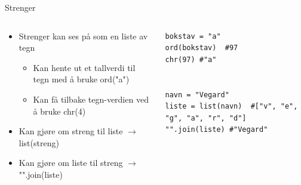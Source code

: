 \documentclass[screen, aspectratio=169]{beamer}
\begin{document}
\begin{frame}[fragile]{Strenger}
	\begin{columns}
		\begin{column}{.6\textwidth}
			\begin{itemize}
				\item Strenger kan ses på som en liste av tegn
				\begin{itemize}
					\item Kan hente ut et tallverdi til tegn med å bruke ord("a")
					\item Kan få tilbake tegn-verdien ved å bruke chr(4)
				\end{itemize}
				\item Kan gjøre om streng til liste $\rightarrow$ list(streng)
				\item Kan gjøre om liste til streng $\rightarrow$ "".join(liste)
			\end{itemize}
		\end{column}
		\begin{column}{.4\textwidth}
			\begin{lstlisting}
bokstav = "a"
ord(bokstav)  #97
chr(97) #"a"


navn = "Vegard"
liste = list(navn)  #["v", "e", "g", "a", "r", "d"]
"".join(liste) #"Vegard"

			\end{lstlisting}
		\end{column}
	\end{columns}
\end{frame}
\end{document}
